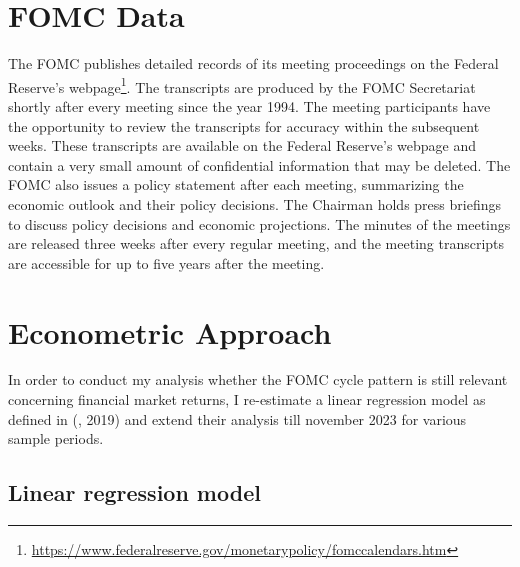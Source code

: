 \section{FOMC Data}

The FOMC publishes detailed records of its meeting proceedings on the Federal Reserve's webpage\footnote{\url{https://www.federalreserve.gov/monetarypolicy/fomccalendars.htm}}.  
The transcripts are produced by the FOMC Secretariat shortly after every meeting since the year 1994.
The meeting participants have the opportunity to review the transcripts for accuracy within the subsequent weeks. 
These transcripts are available on the Federal Reserve's webpage and contain a very small amount of confidential information that may be deleted. 
The FOMC also issues a policy statement after each meeting,  summarizing the economic outlook and their policy decisions. 
The Chairman holds press briefings to discuss policy decisions and economic projections. 
The minutes of the meetings are released three weeks after every regular meeting, and the meeting transcripts are accessible for up to five years after the meeting.

\section{Econometric Approach}

In order to conduct my analysis whether the FOMC cycle pattern is still relevant concerning financial market returns, I re-estimate a linear regression model as defined in (\cite{cieslak_stock_2019},  2019) and extend their analysis till november 2023 for various sample periods.

\subsection{Linear regression model}

